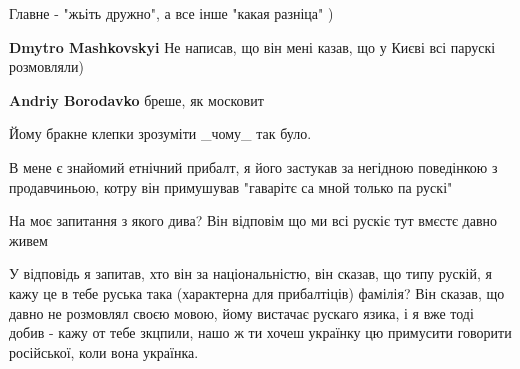 \begin{itemize}
 
Главне - "жьіть дружно", а все інше "какая разніца" )

\begin{itemize}
 
\textbf{Dmytro Mashkovskyi}
Не написав, що він мені казав, що у Києві всі парускі розмовляли)

 
\textbf{Andriy Borodavko} бреше, як московит

 
Йому бракне клепки зрозуміти \_чому\_ так було.
\end{itemize}

 

В мене є знайомий етнічний прибалт, я його застукав за негідною поведінкою з
продавчиньою, котру він примушував "гаварітє са мной только па рускі"

На моє запитання з якого дива? Він відповім що ми всі рускіє тут вмєстє давно
живем

У відповідь я запитав, хто він за національністю, він сказав, що типу рускій, я
кажу це в тебе руська така (характерна для прибалтіців) фамілія? Він сказав, що
давно не розмовлял своєю мовою, йому вистачає рускаго язика, і я вже тоді добив
- кажу от тебе зкцпили, нашо ж ти хочеш українку цю примусити говорити
російської, коли вона українка.


\end{itemize}

